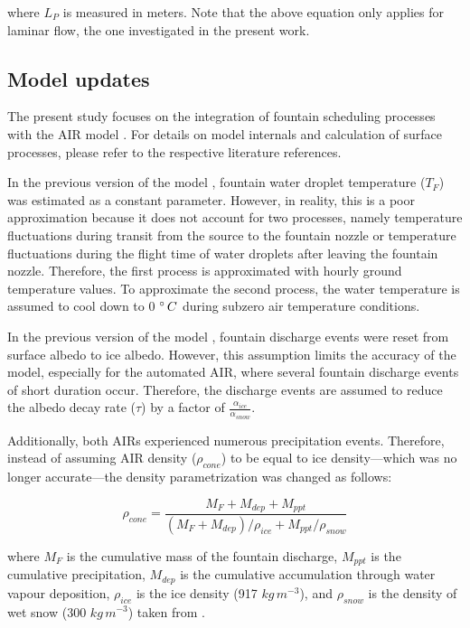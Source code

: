 \documentclass[tc, manuscript]{copernicus}
\begin{document}
where $L_P$ is measured in meters. Note that the above equation only applies for laminar flow, the one
investigated in the present work.

\subsection{Model updates}

The present study focuses on the integration of fountain scheduling processes with the AIR model
\citep{balasubramanianInfluenceMeteorologicalConditions2022}. For details on model internals and calculation of
surface processes, please refer to the respective literature references. 

In the previous version of the model \citep{balasubramanianInfluenceMeteorologicalConditions2022}, fountain
water droplet temperature ($T_F$) was estimated as a constant parameter. However, in reality, this is a poor
approximation because it does not account for two processes, namely temperature fluctuations during transit from
the source to the fountain nozzle or temperature fluctuations during the flight time of water droplets after
leaving the fountain nozzle. Therefore, the first process is approximated with hourly ground temperature values.
To approximate the second process, the water temperature is assumed to cool down to 0 $^{\circ}\,C$ during
subzero air temperature conditions.

In the previous version of the model \citep{balasubramanianInfluenceMeteorologicalConditions2022}, fountain
discharge events were reset from surface albedo to ice albedo. However, this assumption limits the accuracy of
the model, especially for the automated AIR, where several fountain discharge events of short duration occur.
Therefore, the discharge events are assumed to reduce the albedo decay rate ($\tau$) by a factor of
$\frac{\alpha_{ice}}{\alpha_{snow}}$.

Additionally, both AIRs experienced numerous precipitation events. Therefore, instead of assuming AIR density
($\rho_{cone}$) to be equal to ice density---which was no longer accurate---the density
parametrization was changed as follows:

\begin{equation}
  \rho_{cone} = \frac{M_{F} + M_{dep} + M_{ppt}}{(M_{F} + M_{dep})/\rho_{ice} + M_{ppt}/\rho_{snow}}
\end{equation}

where $M_F$ is the cumulative mass of the fountain discharge, $M_{ppt}$ is the cumulative precipitation,
$M_{dep}$ is the cumulative accumulation through water vapour deposition, $\rho_{ice}$ is the ice density (917
$kg\,m^{-3}$), and $\rho_{snow}$ is the density of wet snow (300 $kg\,m^{-3}$) taken from
\cite{cuffeyPhysicsGlaciers2010}.
\end{document}
